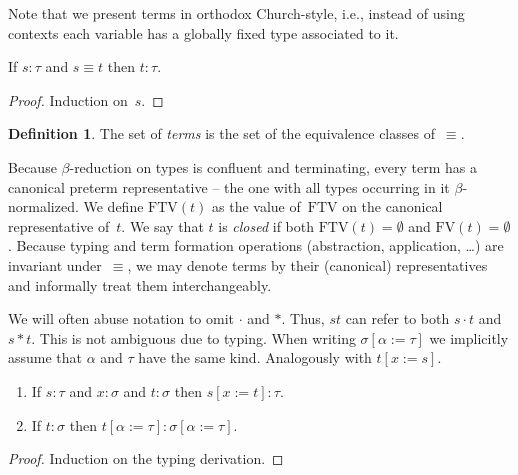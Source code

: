 \documentclass[a4paper,UKenglish,cleveref,autoref,numberwithinsect]{lipics-v2019}
\theoremstyle{definition}
\newtheorem{defn}[theorem]{Definition}
\newcommand{\app}[2]{#1 \cdot #2}
\newcommand{\tapp}[2]{#1 * #2}
\newcommand{\subst}[2]{#1:=#2}
\newcommand{\FTV}{\mathrm{FTV}}
\newcommand{\FV}{\mathrm{FV}}
\begin{document}
Note that we present terms in orthodox Church-style, i.e., instead of
using contexts each variable has a globally fixed type associated to
it.

\begin{lemma}
  If $s : \tau$ and $s \equiv t$ then $t : \tau$.
\end{lemma}

\begin{proof}
  Induction on~$s$.
\end{proof}

\begin{defn}\label{def_terms}
  The set of \emph{terms} is the set of the equivalence classes
  of~$\equiv$.
\end{defn}

Because $\beta$-reduction on types is confluent and terminating, every
term has a canonical preterm representative -- the one with all types
occurring in it $\beta$-normalized.
We define $\FTV(t)$
as the value of~$\FTV$ on the canonical representative of~$t$.
We say that $t$ is \emph{closed} if both $\FTV(t) = \emptyset$
and $\FV(t) = \emptyset$.
%
Because typing and term formation operations (abstraction,
application, \ldots) are invariant under~$\equiv$, we may denote terms
by their (canonical) representatives and informally treat them
interchangeably.

We will often abuse notation to omit $\cdot$ and $*$. Thus, $s t$ can
refer to both $\app{s}{t}$ and $\tapp{s}{t}$. This is not ambiguous
due to typing. When writing $\sigma[\subst{\alpha}{\tau}]$ we
implicitly assume that $\alpha$ and $\tau$ have the same
kind. Analogously with $t[\subst{x}{s}]$.

\begin{lemma}\label{lem:substitution}
  \begin{enumerate}
  \item If $s : \tau$ and $x : \sigma$ and $t : \sigma$ then
    $s[\subst{x}{t}] : \tau$.
  \item If $t : \sigma$ then
    $t[\subst{\alpha}{\tau}] : \sigma[\subst{\alpha}{\tau}]$.
  \end{enumerate}
\end{lemma}

\begin{proof}
  Induction on the typing derivation.
\end{proof}
\end{document}
